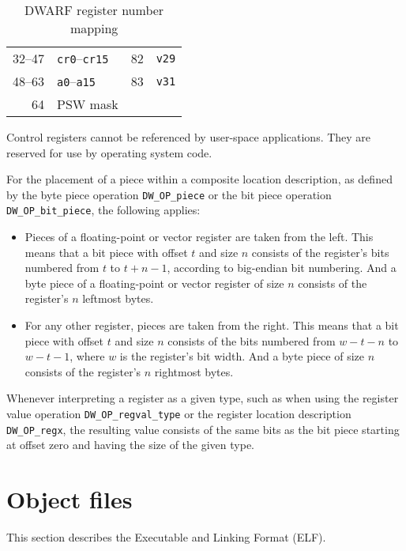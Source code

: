 \documentclass[english,11pt,twoside,toc=bib,toc=idx]{scrreprt}
\newenvironment{DIFnomarkup}{}{} %
\begin{document}
\begin{table}
\begin{DIFnomarkup}
\begin{threeparttable}
\begin{tabular}[t]{rl!{\qquad}rl}
      32--47 & \texttt{cr0}--\texttt{cr15}\tnote{\dagger}
                        & 82 & \texttt{v29} \\
      48--63 & \texttt{a0}--\texttt{a15}
                        & 83 & \texttt{v31} \\
      64 & PSW mask \\
      \bottomrule
    \end{tabular}
    \medskip
    \begin{tablenotes}
    \item [\dagger] Control registers cannot be referenced by user-space
      applications.  They are reserved for use by operating system code.
    \end{tablenotes}
  \end{threeparttable}
  \end{DIFnomarkup}
  \caption{DWARF register number mapping}
  \label{tab:dwarfreg}
\end{table}


For the placement of a piece within a composite location description, as
defined by the byte piece operation \texttt{DW\_OP\_piece} or the bit
piece operation \texttt{DW\_OP\_bit\_piece}, the following applies:
\begin{itemize}
\item Pieces of a floating-point or vector register are taken from the
  left.  This means that a bit piece with offset \(t\) and size \(n\)
  consists of the register's bits numbered from \(t\) to \(t+n-1\),
  according to big-endian bit numbering.  And a byte piece of a
  floating-point or vector register of size \(n\) consists of the
  register's \(n\) leftmost bytes.
\item For any other register, pieces are taken from the right.  This means
  that a bit piece with offset \(t\) and size \(n\) consists of the bits
  numbered from \(w-t-n\) to \(w-t-1\), where \(w\) is the register's bit
  width.  And a byte piece of size \(n\) consists of the register's \(n\)
  rightmost bytes.
\end{itemize}

Whenever interpreting a register as a given type, such as when using the
register value operation \texttt{DW\_OP\_regval\_type} or the register
location description \texttt{DW\_OP\_regx}, the resulting value consists
of the same bits as the bit piece starting at offset zero and having the
size of the given type.

\chapter{Object files}
\label{chobjfiles}
This section describes the Executable and Linking Format (ELF).
\end{document}
